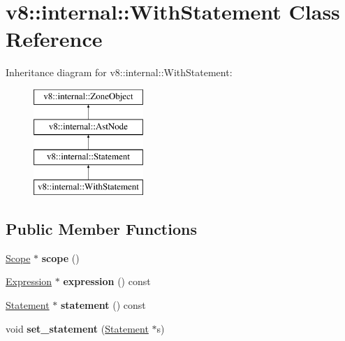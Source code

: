 \hypertarget{classv8_1_1internal_1_1WithStatement}{}\section{v8\+:\+:internal\+:\+:With\+Statement Class Reference}
\label{classv8_1_1internal_1_1WithStatement}
Inheritance diagram for v8\+:\+:internal\+:\+:With\+Statement\+:\begin{figure}[H]
\begin{center}
\leavevmode
\includegraphics[height=4.000000cm]{classv8_1_1internal_1_1WithStatement}
\end{center}
\end{figure}
\subsection*{Public Member Functions}
\begin{DoxyCompactItemize}
\item 
\mbox{\label{classv8_1_1internal_1_1WithStatement_a23bd9034a3bf3509007fbccaa14a6ff0}} 
\mbox{\hyperlink{classv8_1_1internal_1_1Scope}{Scope}} $\ast$ {\bfseries scope} ()
\item 
\mbox{\label{classv8_1_1internal_1_1WithStatement_af32f77809f95c30f951da1fae7fd0463}} 
\mbox{\hyperlink{classv8_1_1internal_1_1Expression}{Expression}} $\ast$ {\bfseries expression} () const
\item 
\mbox{\label{classv8_1_1internal_1_1WithStatement_a00976561e5fd73e4cb773b743a58036e}} 
\mbox{\hyperlink{classv8_1_1internal_1_1Statement}{Statement}} $\ast$ {\bfseries statement} () const
\item 
\mbox{\label{classv8_1_1internal_1_1WithStatement_a505b2df7e8b4e3fef4b68f711bb3bde8}} 
void {\bfseries set\+\_\+statement} (\mbox{\hyperlink{classv8_1_1internal_1_1Statement}{Statement}} $\ast$s)
\end{DoxyCompactItemize}

